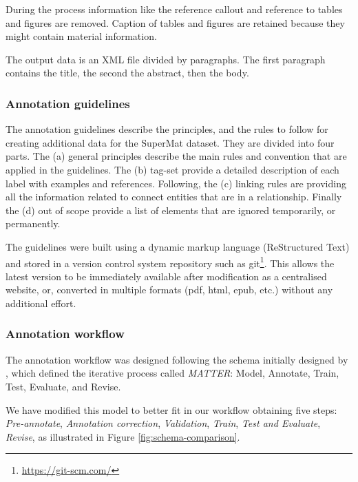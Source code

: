 \documentclass[a4paper,10pt]{article}
\begin{document}
During the process information like the reference callout and reference to tables and figures are removed. 
Caption of tables and figures are retained because they might contain material information. 

The output data is an XML file divided by paragraphs. The first paragraph contains the title, the second the abstract, then the body.



\subsubsection{Annotation guidelines}
\label{subsec:annotation-guidelines}
The annotation guidelines describe the principles, and the rules to follow for creating additional data for the SuperMat dataset.
They are divided into four parts. The (a) general principles describe the main rules and convention that are applied in the guidelines. The (b) tag-set provide a detailed description of each label with examples and references. Following, the (c) linking rules are providing all the information related to connect entities that are in a relationship. Finally the (d) out of scope provide a list of elements that are ignored temporarily, or permanently. 

The guidelines were built using a dynamic markup language (ReStructured Text) and stored in a version control system repository such as git\footnote{\url{https://git-scm.com/}}. This allows the latest version to be immediately available after modification as a centralised website, or, converted in multiple formats (pdf, html, epub, etc.) without any additional effort. 

\subsubsection{Annotation workflow}
\label{subsec:annotation-workflow}
The annotation workflow was designed following the schema initially designed by \cite{pustejovsky2012natural}, which defined the iterative process called \textit{MATTER}: Model, Annotate, Train, Test, Evaluate, and Revise.

We have modified this model to better fit in our workflow obtaining five steps: \textit{Pre-annotate}, \textit{Annotation correction}, \textit{Validation}, \textit{Train}, \textit{Test and Evaluate}, \textit{Revise}, as illustrated in Figure \ref{fig:schema-comparison}. 
\end{document}
